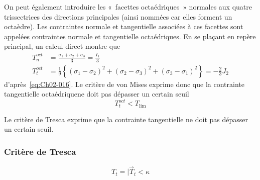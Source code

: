 On peut également introduire les «~facettes octaédriques~» normales aux quatre trissectrices des directions principales (ainsi nommées car elles forment un octaèdre).
Les contraintes normale et tangentielle associées à ces facettes sont appelées contraintes normale et tangentielle octaédriques.
En se plaçant en repère principal, un calcul direct montre que 
\begin{equation}
    \begin{aligned}
        T_n^{oct} &= \frac{\sigma_1+\sigma_2+\sigma_3}{3} = \frac{I_1}{3} \\
        T_t^{oct} &= \frac{1}{9}\left\{ \left(\sigma_1-\sigma_2\right)^2 + \left(\sigma_2-\sigma_3\right)^2 + \left(\sigma_3-\sigma_1\right)^2 \right\} = -\frac{2}{3} J_2
    \end{aligned}
    \label{eq:Ch05-066}
\end{equation}
d'après~\eqref{eq:Ch02-016}.
Le critère de von Mises exprime donc que la contrainte tangentielle octaédriquene doit pas dépasser un certain seuil 
\begin{equation}
    T_t^{oct} < T_{\mathrm{lim}}
    \label{eq:Ch05-067}
\end{equation}

Le critère de Tresca exprime que la contrainte tangentielle ne doit pas dépasser un certain seuil.

\subsubsection{Critère de Tresca}
\begin{equation}
    T_t = |\vec{T}_t < \kappa
    \label{eq:Ch05-068}
\end{equation}

